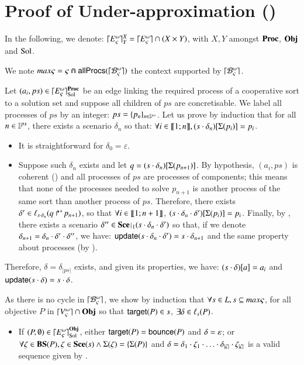 \section{Proof of Under-approximation ()}
\label{suppl:demoapproxinf}

In the following, we denote:
$\lceil E_\varsigma^\omega\rceil^{X}_{Y} = \lceil E_\varsigma^\omega\rceil \cap (X \times Y)$, with $X, Y$ amongst $\mathbf{Proc}$, $\mathbf{Obj}$ and $\mathrm{Sol}$.

\begin{proofapproxinf}
We note $max\varsigma = \varsigma \Cap \mathsf{allProcs}(\lceil \mathcal{B}_\varsigma^\omega\rceil)$ the context supported by $\lceil \mathcal{B}_\varsigma^\omega\rceil$.

Let $(a_i, ps) \in \lceil E_\varsigma^\omega\rceil^{\mathbf{Proc}}_{\mathrm{Sol}}$ be an edge linking the required process of a cooperative sort to a solution set and suppose all children of $ps$ are concretisable.
We label all processes of $ps$ by an integer: $ps = \{ p_n \}_{n \in \mathbb{I}^{ps}}$.
Let us prove by induction that for all $n \in \mathbb{I}^{ps}$, there exists a scenario $\delta_n$ so that:
$\forall i \in \llbracket 1; n \rrbracket, {(s \cdot \delta_n)[\Sigma(p_i)]} = p_i$.
\begin{itemize}
  \item It is straightforward for $\delta_0 = \varepsilon$.
  \item Suppose such $\delta_n$ exists and let $q = {(s \cdot \delta_n)[\Sigma(p_{n+1})]}$.
    By hypothesis, $(a_i, ps)$ is coherent () and all processes of $ps$ are processes of components;
    this means that none of the processes needed to solve $p_{n+1}$ is another process of the same sort than another process of $ps$.
    Therefore, there exists $\delta' \in \ell_{s \cdot \delta_n}(\mbox{$q\Rsh^*\!p_{n+1}$})$,
    so that $\forall i \in \llbracket 1; n+1 \rrbracket$, ${(s \cdot \delta_n \cdot \delta')[\Sigma(p_{i})]} = p_{i}$.
    Finally, by , there exists a scenario $\delta'' \in \restriction{\Sce}{1}(s \PHplay \delta_n \PHplay \delta')$
    so that, if we denote $\delta_{n+1} = \delta_n \cdot \delta' \cdot \delta''$,
    we have: $\mathsf{update}(s \cdot \delta_n \cdot \delta') = s \cdot
	\delta_{n+1}$ and the same property about processes (by ).
\end{itemize}
Therefore, $\delta = \delta_{|ps|}$ exists, and given its properties, we have: ${(s \cdot \delta)[a]} = a_i$
and $\mathsf{update}(s \cdot \delta) = s \cdot \delta$.

As there is no cycle in $\lceil \mathcal{B}_\varsigma^\omega\rceil$, we show by induction that $\forall s\in L, s\subseteq max\varsigma$, 
for all objective $P$ in $\lceil V_\varsigma^\omega\rceil \cap \mathbf{Obj}$ so that $\mathsf{target}(P) \in s$,
$\exists \delta \in \ell_s(P)$.
\begin{itemize}
  \item If $(P, \emptyset) \in \lceil E_\varsigma^\omega\rceil^{\mathbf{Obj}}_{\mathrm{Sol}}$, either $\mathsf{target}(P) = \mathsf{bounce}(P)$ and $\delta = \varepsilon$;
    or $\forall \zeta \in \mathbf{BS}(P), \zeta \in \mathbf{Sce}(s) \wedge \Sigma(\zeta) = \{ \Sigma(P) \}$
    and $\delta = \delta_1 \PHplay \zeta_1 \PHplay \dots \PHplay
	\delta_{|\zeta|} \PHplay \zeta_{|\zeta|}$ is a valid sequence given by
	.


\end{itemize}
\end{proofapproxinf}

